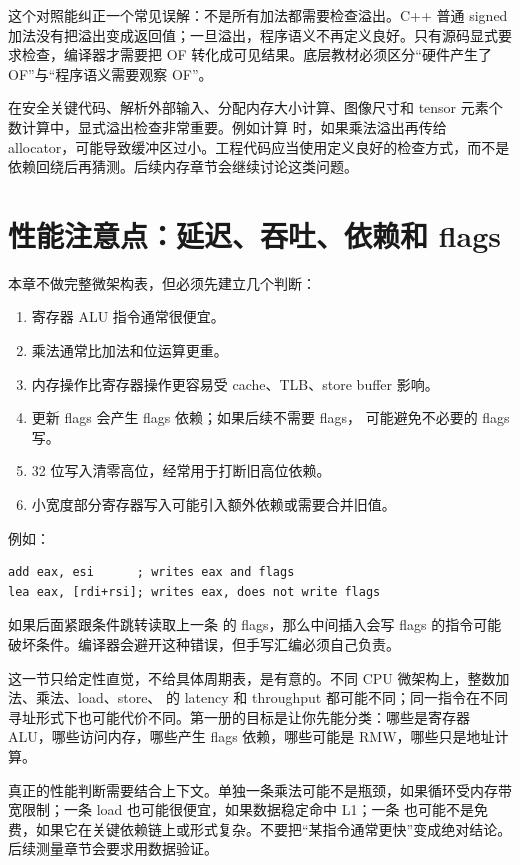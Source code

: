 这个对照能纠正一个常见误解：不是所有加法都需要检查溢出。C++ 普通 signed 加法没有把溢出变成返回值；一旦溢出，程序语义不再定义良好。只有源码显式要求检查，编译器才需要把 OF 转化成可见结果。底层教材必须区分“硬件产生了 OF”与“程序语义需要观察 OF”。

在安全关键代码、解析外部输入、分配内存大小计算、图像尺寸和 tensor 元素个数计算中，显式溢出检查非常重要。例如计算  时，如果乘法溢出再传给 allocator，可能导致缓冲区过小。工程代码应当使用定义良好的检查方式，而不是依赖回绕后再猜测。后续内存章节会继续讨论这类问题。

\section{性能注意点：延迟、吞吐、依赖和 flags}

本章不做完整微架构表，但必须先建立几个判断：

\begin{enumerate}
  \item 寄存器 ALU 指令通常很便宜。
  \item 乘法通常比加法和位运算更重。
  \item 内存操作比寄存器操作更容易受 cache、TLB、store buffer 影响。
  \item 更新 flags 会产生 flags 依赖；如果后续不需要 flags， 可能避免不必要的 flags 写。
  \item 32 位写入清零高位，经常用于打断旧高位依赖。
  \item 小宽度部分寄存器写入可能引入额外依赖或需要合并旧值。
\end{enumerate}

例如：

\begin{lstlisting}
add eax, esi      ; writes eax and flags
lea eax, [rdi+rsi]; writes eax, does not write flags
\end{lstlisting}

如果后面紧跟条件跳转读取上一条  的 flags，那么中间插入会写 flags 的指令可能破坏条件。编译器会避开这种错误，但手写汇编必须自己负责。

这一节只给定性直觉，不给具体周期表，是有意的。不同 CPU 微架构上，整数加法、乘法、load、store、 的 latency 和 throughput 都可能不同；同一指令在不同寻址形式下也可能代价不同。第一册的目标是让你先能分类：哪些是寄存器 ALU，哪些访问内存，哪些产生 flags 依赖，哪些可能是 RMW，哪些只是地址计算。

真正的性能判断需要结合上下文。单独一条乘法可能不是瓶颈，如果循环受内存带宽限制；一条 load 也可能很便宜，如果数据稳定命中 L1；一条  也可能不是免费，如果它在关键依赖链上或形式复杂。不要把“某指令通常更快”变成绝对结论。后续测量章节会要求用数据验证。

